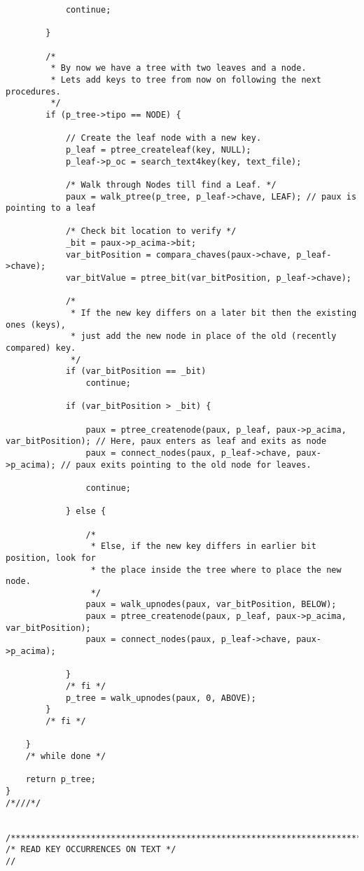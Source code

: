 \documentclass[a4paper,10pt]{article}
\begin{document}
\begin{verbatim}
            continue;

        }

        /*
         * By now we have a tree with two leaves and a node.
         * Lets add keys to tree from now on following the next procedures.
         */
        if (p_tree->tipo == NODE) {

            // Create the leaf node with a new key.
            p_leaf = ptree_createleaf(key, NULL);
            p_leaf->p_oc = search_text4key(key, text_file);

            /* Walk through Nodes till find a Leaf. */
            paux = walk_ptree(p_tree, p_leaf->chave, LEAF); // paux is pointing to a leaf

            /* Check bit location to verify */
            _bit = paux->p_acima->bit;
            var_bitPosition = compara_chaves(paux->chave, p_leaf->chave);
            var_bitValue = ptree_bit(var_bitPosition, p_leaf->chave);

            /*
             * If the new key differs on a later bit then the existing ones (keys),
             * just add the new node in place of the old (recently compared) key.
             */
            if (var_bitPosition == _bit)
                continue;

            if (var_bitPosition > _bit) {

                paux = ptree_createnode(paux, p_leaf, paux->p_acima, var_bitPosition); // Here, paux enters as leaf and exits as node
                paux = connect_nodes(paux, p_leaf->chave, paux->p_acima); // paux exits pointing to the old node for leaves.

                continue;

            } else {

                /*
                 * Else, if the new key differs in earlier bit position, look for
                 * the place inside the tree where to place the new node.
                 */
                paux = walk_upnodes(paux, var_bitPosition, BELOW);
                paux = ptree_createnode(paux, p_leaf, paux->p_acima, var_bitPosition);
                paux = connect_nodes(paux, p_leaf->chave, paux->p_acima);

            }
            /* fi */
            p_tree = walk_upnodes(paux, 0, ABOVE);
        }
        /* fi */

    }
    /* while done */

    return p_tree;
}
/*///*/


/******************************************************************************/
/* READ KEY OCCURRENCES ON TEXT */
//
        

\end{verbatim}
\end{document}
